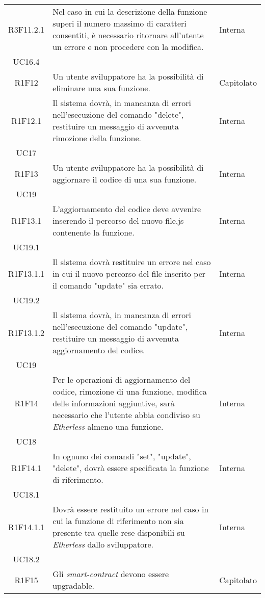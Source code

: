 \begin{longtable}{|c|p{8cm}|C{2cm}|}
	R3F11.2.1 &  Nel caso in cui la descrizione della funzione superi il numero massimo di caratteri consentiti, è necessario ritornare all'utente un errore e non procedere con la modifica. & \centering Interna \\ UC16.4 \tabularnewline
	
	R1F12 &  Un utente sviluppatore ha la possibilità di eliminare una sua funzione. & Capitolato \\
	
	R1F12.1 & Il sistema dovrà, in mancanza di errori nell'esecuzione del comando "delete", restituire un messaggio di avvenuta rimozione della funzione. & \centering Interna \\ UC17 \tabularnewline
	
	R1F13 &  Un utente sviluppatore ha la possibilità di aggiornare il codice di una sua funzione. & \centering Interna \\ UC19 \tabularnewline
	
	R1F13.1 &  L'aggiornamento del codice deve avvenire inserendo il percorso del nuovo file.js contenente la funzione. & \centering Interna \\ UC19.1 \tabularnewline
	
	R1F13.1.1 & Il sistema dovrà restituire un errore nel caso in cui il nuovo percorso del file inserito per il comando "update" sia errato. & \centering Interna \\ UC19.2 \tabularnewline
	
	R1F13.1.2 & Il sistema dovrà, in mancanza di errori nell'esecuzione del comando "update", restituire un messaggio di avvenuta aggiornamento del codice. & \centering Interna \\ UC19 \tabularnewline
	
	R1F14 &  Per le operazioni di aggiornamento del codice, rimozione di una funzione, modifica delle informazioni aggiuntive, sarà necessario che l'utente abbia condiviso su \textit{Etherless} almeno una funzione. & \centering Interna \\ UC18 \tabularnewline
	
	R1F14.1 &  In ognuno dei comandi "set", "update", "delete", dovrà essere specificata la funzione di riferimento. & \centering Interna \\ UC18.1 \tabularnewline
	
	R1F14.1.1 &  Dovrà essere restituito un errore nel caso in cui la funzione di riferimento non sia presente tra quelle rese disponibili su \textit{Etherless} dallo sviluppatore. & \centering Interna \\ UC18.2 \tabularnewline
	
	R1F15 & Gli \textit{smart-contract\glo} devono essere upgradable. & Capitolato \\
	\hline
	
\end{longtable}